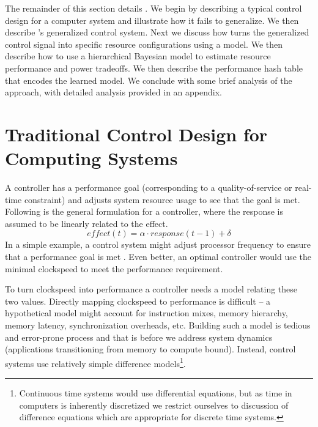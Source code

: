 The remainder of this section details \SYSTEM{}.  We begin by
describing a typical control design for a computer system and
illustrate how it fails to generalize.  We then describe \SYSTEM{}'s
generalized control system.  Next we discuss how \SYSTEM{} turns the
generalized control signal into specific resource configurations using
a model.  We then describe how to use a hierarchical Bayesian model to
estimate resource performance and power tradeoffs.  We then describe
the performance hash table that encodes the learned model. We conclude
with some brief analysis of the approach, with detailed analysis
provided in an appendix.


\section{Traditional Control Design for Computing Systems}
A controller has a performance goal (corresponding to a
quality-of-service or real-time constraint) and adjusts system resource
usage to see that the goal is met. Following is the general formulation for a controller, where the response is assumed to be linearly related to the effect.
\begin{equation}
  effect(t) = \alpha \cdot response(t-1) + \delta \label{eqn:clock}
\end{equation}
In a simple example, a control
system might adjust processor frequency to ensure that a performance
goal is met \cite{lefurgy}.  Even better, an optimal controller would
use the minimal clockspeed to meet the performance requirement.


To turn clockspeed into performance a controller needs a model
relating these two values.  Directly mapping clockspeed to performance
is difficult -- a hypothetical model might account for instruction
mixes, memory hierarchy, memory latency, synchronization overheads,
etc.  Building such a model is tedious and error-prone process and
that is before we address system dynamics (\eg applications
transitioning from memory to compute bound).  Instead, control systems
use relatively simple difference models\footnote{Continuous time
  systems would use differential equations, but as time in computers
  is inherently discretized we restrict ourselves to discussion of
  difference equations which are appropriate for discrete time
  systems.}.

